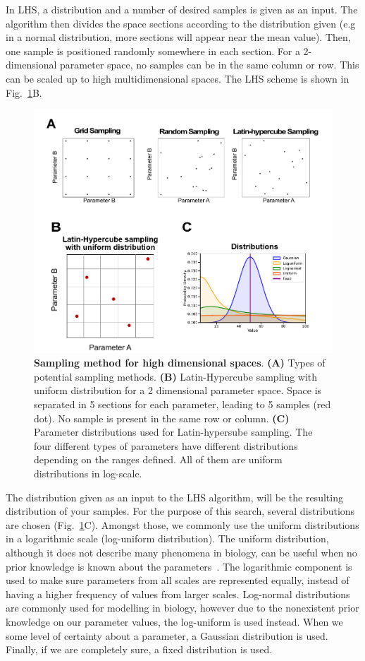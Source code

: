In LHS, a distribution and a number of desired samples is given as an input.
The algorithm then divides the space sections according to the distribution given (e.g in a normal distribution, more sections will appear near the mean value).
Then, one sample is positioned randomly somewhere in each section.
For a 2-dimensional parameter space, no samples can be in the same column or row.
This can be scaled up to high multidimensional spaces.
The LHS scheme is shown in Fig.~\ref{fig:distributions}B.
\begin{figure}[H]

    \includegraphics[width=1\textwidth]{chapters/Methods/distributions}
    \caption{\textbf{Sampling method for high dimensional spaces}. \textbf{(A)} Types of potential sampling methods. \textbf{(B)} Latin-Hypercube sampling with uniform distribution for a 2 dimensional parameter space. Space is separated in 5 sections for each parameter, leading to 5 samples (red dot). No sample is present in the same row or column. \textbf{(C)} Parameter distributions used for Latin-hypersube sampling. The four different types of parameters have different distributions depending on the ranges defined. All of them are uniform distributions in log-scale.}
    \label{fig:distributions}
\end{figure}
The distribution given as an input to the LHS algorithm, will be the resulting distribution of your samples.
For the purpose of this search, several distributions are chosen (Fig.~\ref{fig:distributions}C).
Amongst those, we commonly use the uniform distributions in a logarithmic scale (log-uniform distribution).
The uniform distribution, although it does not describe many phenomena in biology, can be useful when no prior knowledge is known about the parameters~\parencite{Frank2009}.
The logarithmic component is used to make sure parameters from all scales are represented equally, instead of having a higher frequency of values from larger scales.
Log-normal distributions are commonly used for modelling in biology, however due to the nonexistent prior knowledge on our parameter values, the log-uniform is used instead.
When we some level of certainty about a parameter, a Gaussian distribution is used.
Finally, if we are completely sure, a fixed distribution is used.

